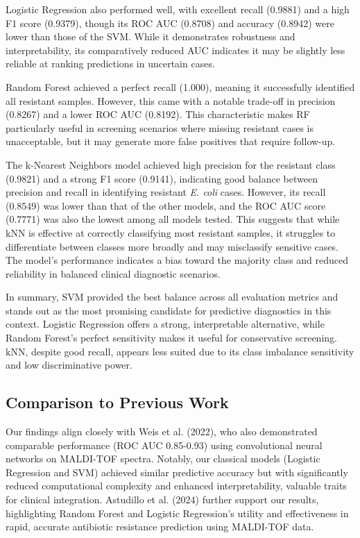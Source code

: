 \documentclass{article}
\begin{document}
Logistic Regression also performed well, with excellent recall (0.9881) and a high F1 score (0.9379), though its ROC AUC (0.8708) and accuracy (0.8942) were lower than those of the SVM. While it demonstrates robustness and interpretability, its comparatively reduced AUC indicates it may be slightly less reliable at ranking predictions in uncertain cases.

Random Forest achieved a perfect recall (1.000), meaning it successfully identified all resistant samples. However, this came with a notable trade-off in precision (0.8267) and a lower ROC AUC (0.8192). This characteristic makes RF particularly useful in screening scenarios where missing resistant cases is unacceptable, but it may generate more false positives that require follow-up.

The k-Nearest Neighbors model achieved high precision for the resistant class (0.9821) and a strong F1 score (0.9141), indicating good balance between precision and recall in identifying resistant \textit{E. coli} cases. However, its recall (0.8549) was lower than that of the other models, and the ROC AUC score (0.7771) was also the lowest among all models tested. This suggests that while kNN is effective at correctly classifying most resistant samples, it struggles to differentiate between classes more broadly and may misclassify sensitive cases. The model's performance indicates a bias toward the majority class and reduced reliability in balanced clinical diagnostic scenarios.

In summary, SVM provided the best balance across all evaluation metrics and stands out as the most promising candidate for predictive diagnostics in this context. Logistic Regression offers a strong, interpretable alternative, while Random Forest's perfect sensitivity makes it useful for conservative screening. kNN, despite good recall, appears less suited due to its class imbalance sensitivity and low discriminative power.


\subsection{Comparison to Previous Work}

Our findings align closely with Weis et al. (2022), who also demonstrated comparable performance (ROC AUC 0.85-0.93) using convolutional neural networks on MALDI-TOF spectra. Notably, our classical models (Logistic Regression and SVM) achieved similar predictive accuracy but with significantly reduced computational complexity and enhanced interpretability, valuable traits for clinical integration. Astudillo et al. (2024) further support our results, highlighting Random Forest and Logistic Regression's utility and effectiveness in rapid, accurate antibiotic resistance prediction using MALDI-TOF data.
\end{document}
